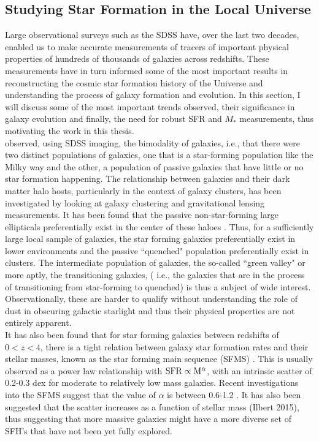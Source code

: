 \subsection{Studying Star Formation in the Local Universe}
\label{sec: results}

Large observational surveys such as the SDSS have, over the last two decades, enabled us to make accurate measurements of tracers of important physical properties of hundreds of thousands of galaxies across redshifts. These measurements have in turn informed some of the most important results in reconstructing the cosmic star formation history of the Universe and understanding the process of galaxy formation and evolution. In this section, I will discuss some of the most important trends observed, their significance in galaxy evolution and finally, the need for robust SFR and $M_{*}$ measurements, thus motivating the work in this thesis.\\

\citet{2001AJ....122.1861S} observed, using SDSS imaging, the bimodality of galaxies, i.e., that there were two distinct populations of galaxies, one that is a star-forming population like the Milky way and the other, a population of passive galaxies that have little or no star formation happening. The relationship between galaxies and their dark matter halo hosts, particularly in the context of galaxy clusters, has been investigated by looking at galaxy clustering and gravitational lensing measurements. It has been found that the passive non-star-forming large ellipticals preferentially exist in the center of these haloes \citep{2005ApJ...633..791Z}. Thus, for a sufficiently large local sample of galaxies, the star forming galaxies preferentially exist in lower environments and the passive ``quenched" population preferentially exist in clusters. The intermediate population of galaxies, the so-called ``green valley" \citep{2007ApJS..173..293W} or more aptly, the transitioning galaxies, ( i.e., the galaxies that are in the process of transitioning from star-forming to quenched) is thus a subject of wide interest. Observationally, these are harder to qualify without understanding the role of dust in obscuring galactic starlight and thus their physical properties are not entirely apparent.\\

It has also been found that for star forming galaxies between redshifts of $0 < z < 4$, there is a tight relation between galaxy star formation rates and their stellar masses, known as the star forming main sequence (SFMS) \citep{brinchmann_physical_2004, 2007ApJ...660L..43N, 2015A&A...575A..74S}. This is usually observed as a power law relationship with ${\rm SFR} \propto {\rm M}^{\alpha}$, with an intrinsic scatter of 0.2-0.3 dex for moderate to relatively low mass galaxies. Recent investigations into the SFMS suggest that the value of $\alpha$ is between 0.6-1.2 \citep{2014ApJS..214...15S}. It has also been suggested that the scatter increases as a function of stellar mass (Ilbert 2015), thus suggesting that more massive galaxies might have a more diverse set of SFH's that have not been yet fully explored.\\

